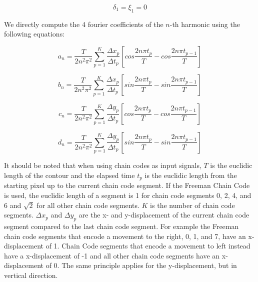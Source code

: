 \documentclass[thesis.tex]{subfiles}
\begin{document}
\begin{equation} \label{eq:dft_delta_first}
 \delta_1 =  \xi_1 = 0
\end{equation} 
 
We directly compute the 4 fourier coefficients of the $n$-th harmonic using the following equations:

\begin{equation} \label{eq:dft_a_n}
 a_n = \frac{T}{2n^2\pi^2} \sum_{p=1}^{K}\frac{\Delta x_p}{\Delta t_p}[cos\frac{2n\pi t_p}{T} - cos\frac{2n\pi t_{p-1}}{T}]
\end{equation} 

\begin{equation} \label{eq:dft_b_n}
 b_n = \frac{T}{2n^2\pi^2} \sum_{p=1}^{K}\frac{\Delta x_p}{\Delta t_p}[sin\frac{2n\pi t_p}{T} - sin\frac{2n\pi t_{p-1}}{T}]
\end{equation}
 
\begin{equation} \label{eq:dft_c_n}
 c_n = \frac{T}{2n^2\pi^2} \sum_{p=1}^{K}\frac{\Delta y_p}{\Delta t_p}[cos\frac{2n\pi t_p}{T} - cos\frac{2n\pi t_{p-1}}{T}]
\end{equation} 

\begin{equation} \label{eq:dft_d_n}
 d_n = \frac{T}{2n^2\pi^2} \sum_{p=1}^{K}\frac{\Delta y_p}{\Delta t_p}[sin\frac{2n\pi t_p}{T} - sin\frac{2n\pi t_{p-1}}{T}]
\end{equation}

It should be noted that when using chain codes as input signals, $T$ is the euclidic length of the contour and the elapsed time $t_p$ is the euclidic length from the starting pixel up to the current chain code segment. If the Freeman Chain Code is used, the euclidic length of a segment is 1 for chain code segments 0, 2, 4, and 6 and $\sqrt{2}$ for all other chain code segments. $K$ is the number of chain code segments. $\Delta x_p$ and $\Delta y_p$ are the x- and y-displacement of the current chain code segment compared to the last chain code segment. For example the Freeman chain code segments that encode a movement to the right, 0, 1, and 7, have an x-displacement of 1. Chain Code segments that encode a movement to left instead have a x-displacement of -1 and all other chain code segments have an x-displacement of 0. The same principle applies for the y-displacement, but in vertical direction.
\end{document}
